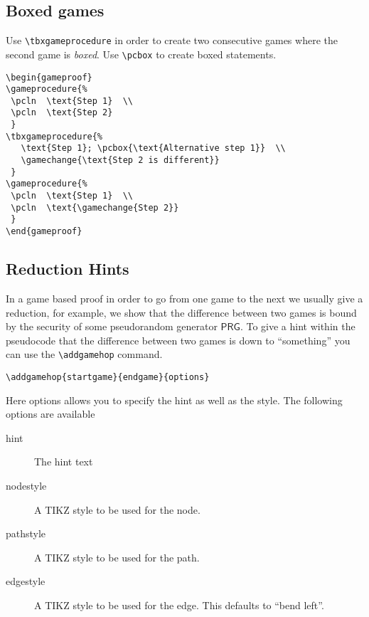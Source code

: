 \documentclass[a4paper]{report}
\begin{document}
\subsection{Boxed games}
Use \lstinline$\tbxgameprocedure$ in order to create two consecutive games where the second game is \emph{boxed}. Use
\lstinline$\pcbox$ to create boxed statements.
\begin{center}
\begin{gameproof}
\end{gameproof}
\end{center}

\begin{lstlisting}
\begin{gameproof}
\gameprocedure{%
 \pcln  \text{Step 1}  \\
 \pcln  \text{Step 2}  
 }
\tbxgameprocedure{%
   \text{Step 1}; \pcbox{\text{Alternative step 1}}  \\
   \gamechange{\text{Step 2 is different}}  
 }
\gameprocedure{%
 \pcln  \text{Step 1}  \\
 \pcln  \text{\gamechange{Step 2}}  
 } 
\end{gameproof}
\end{lstlisting}

\subsection{Reduction Hints}
In a game based proof in order to go from one game to the next we usually give a reduction, for example, we show that
the difference between two games is bound by the security of some pseudorandom generator $\mathsf{PRG}$. To give a hint
within the pseudocode that the difference between two games is down to ``something'' you can use the \lstinline$\addgamehop$
command.
\begin{lstlisting}
\addgamehop{startgame}{endgame}{options}
\end{lstlisting}
Here options allows you to specify the hint as well as the style. The following options are available
\begin{description}
\item[hint]
The hint text
\item[nodestyle]
A TIKZ style to be used for the node.
\item[pathstyle]
A TIKZ style to be used for the path.
\item[edgestyle]
A TIKZ style to be used for the edge. This defaults to \enquote{bend left}.
\end{description}
\end{document}
